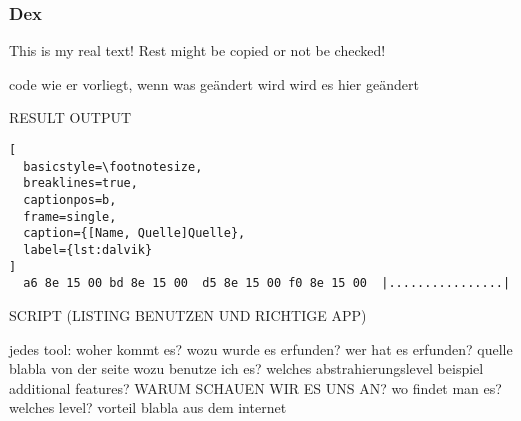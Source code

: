 \subsubsection{Dex} \label{subsubsection:tools-dex}
This is my real text! Rest might be copied or not be checked!




code wie er vorliegt, wenn was geändert wird wird es hier geändert

RESULT OUTPUT

\begin{lstlisting}[
  basicstyle=\footnotesize,
  breaklines=true,
  captionpos=b,
  frame=single,
  caption={[Name, Quelle]Quelle},
  label={lst:dalvik}
]
  a6 8e 15 00 bd 8e 15 00  d5 8e 15 00 f0 8e 15 00  |................|
\end{lstlisting}

SCRIPT (LISTING BENUTZEN UND RICHTIGE APP)



jedes tool:\newline
woher kommt es?\newline
wozu wurde es erfunden?\newline
wer hat es erfunden? quelle\newline
blabla von der seite\newline
wozu benutze ich es?\newline
welches abstrahierungslevel\newline
beispiel\newline
additional features?\newline
WARUM SCHAUEN WIR ES UNS AN?\newline
wo findet man es?\newline
welches level?\newline
vorteil\newline
blabla aus dem internet\newline
